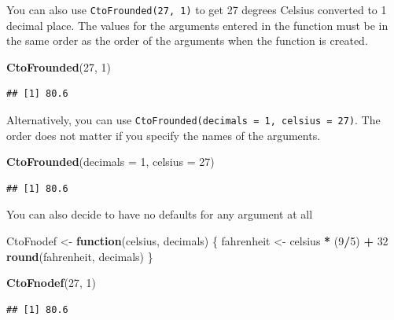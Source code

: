 \documentclass[
]{book}
\newenvironment{Shaded}{\begin{snugshade}}{\end{snugshade}}
\newcommand{\AttributeTok}[1]{\textcolor[rgb]{0.13,0.29,0.53}{#1}}
\newcommand{\ControlFlowTok}[1]{\textcolor[rgb]{0.13,0.29,0.53}{\textbf{#1}}}
\newcommand{\DecValTok}[1]{\textcolor[rgb]{0.00,0.00,0.81}{#1}}
\newcommand{\FunctionTok}[1]{\textcolor[rgb]{0.13,0.29,0.53}{\textbf{#1}}}
\newcommand{\NormalTok}[1]{#1}
\newcommand{\OtherTok}[1]{\textcolor[rgb]{0.56,0.35,0.01}{#1}}
\newcommand{\SpecialCharTok}[1]{\textcolor[rgb]{0.81,0.36,0.00}{\textbf{#1}}}
\theoremstyle{definition}
\theoremstyle{definition}
\theoremstyle{definition}
\theoremstyle{definition}
\theoremstyle{remark}
\begin{document}
You can also use \texttt{CtoFrounded(27,\ 1)} to get 27 degrees Celsius converted to 1 decimal place. The values for the arguments entered in the function must be in the same order as the order of the arguments when the function is created.

\begin{Shaded}
\begin{Highlighting}[]
\FunctionTok{CtoFrounded}\NormalTok{(}\DecValTok{27}\NormalTok{, }\DecValTok{1}\NormalTok{)}
\end{Highlighting}
\end{Shaded}

\begin{verbatim}
## [1] 80.6
\end{verbatim}

Alternatively, you can use \texttt{CtoFrounded(decimals\ =\ 1,\ celsius\ =\ 27)}. The order does not matter if you specify the names of the arguments.

\begin{Shaded}
\begin{Highlighting}[]
\FunctionTok{CtoFrounded}\NormalTok{(}\AttributeTok{decimals =} \DecValTok{1}\NormalTok{, }\AttributeTok{celsius =} \DecValTok{27}\NormalTok{)}
\end{Highlighting}
\end{Shaded}

\begin{verbatim}
## [1] 80.6
\end{verbatim}

You can also decide to have no defaults for any argument at all

\begin{Shaded}
\begin{Highlighting}[]
\NormalTok{CtoFnodef }\OtherTok{\textless{}{-}} \ControlFlowTok{function}\NormalTok{(celsius, decimals) \{}
\NormalTok{  fahrenheit }\OtherTok{\textless{}{-}}\NormalTok{ celsius }\SpecialCharTok{*}\NormalTok{ (}\DecValTok{9}\SpecialCharTok{/}\DecValTok{5}\NormalTok{) }\SpecialCharTok{+} \DecValTok{32}
  \FunctionTok{round}\NormalTok{(fahrenheit, decimals)}
\NormalTok{\}}

\FunctionTok{CtoFnodef}\NormalTok{(}\DecValTok{27}\NormalTok{, }\DecValTok{1}\NormalTok{)}
\end{Highlighting}
\end{Shaded}

\begin{verbatim}
## [1] 80.6
\end{verbatim}
\end{document}
